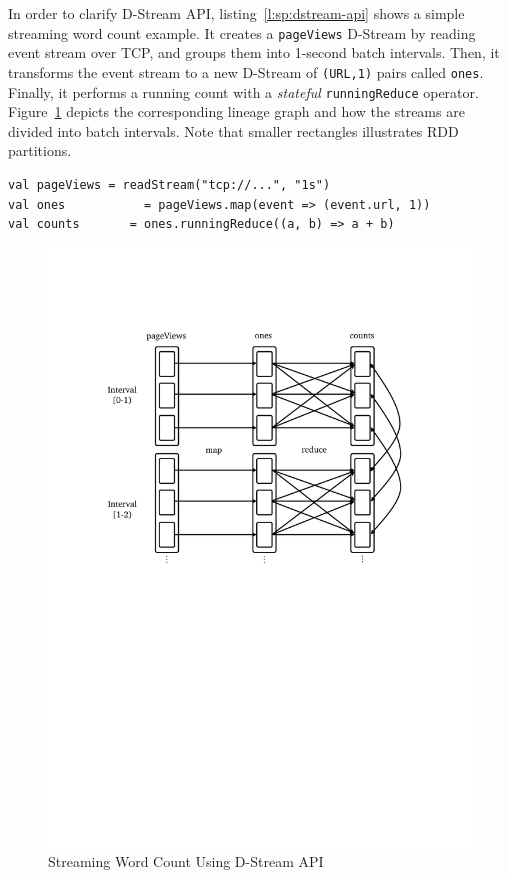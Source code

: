 In order to clarify D-Stream API, listing~\ref{l:sp:dstream-api} shows a simple streaming word count example. It creates a \lstinline$pageViews$ D-Stream by
reading event stream over TCP, and groups them into 1-second batch intervals. Then, it transforms the event stream to a new D-Stream of \lstinline$(URL,1)$ pairs called
\lstinline$ones$. Finally, it performs a running count with a \emph{stateful} \lstinline$runningReduce$ operator. Figure~\ref{fig:sp:dstream-api} depicts the corresponding lineage graph and how the streams are divided into batch intervals. Note that smaller rectangles illustrates RDD partitions.
\begin{lstlisting}[float=h, caption={Streaming Word Count using D-Stream API},label={l:sp:dstream-api},captionpos=b,morekeywords={val}]
val pageViews = readStream("tcp://...", "1s")
val ones           = pageViews.map(event => (event.url, 1))
val counts       = ones.runningReduce((a, b) => a + b)
\end{lstlisting}
\begin{figure}[!htbp]
    \centering
    \includegraphics[clip,trim=2.5cm 14cm 3.2cm 4cm,scale=0.8]{dstream-example.pdf}
    \caption[Streaming Word Count Using D-Stream API]{Streaming Word Count Using D-Stream API\footnotemark}
    \label{fig:sp:dstream-api}
\end{figure}

